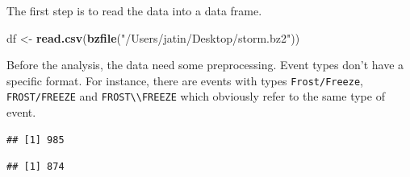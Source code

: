 \documentclass[]{article}
\newenvironment{Shaded}{\begin{snugshade}}{\end{snugshade}}
\newcommand{\KeywordTok}[1]{\textcolor[rgb]{0.13,0.29,0.53}{\textbf{#1}}}
\newcommand{\StringTok}[1]{\textcolor[rgb]{0.31,0.60,0.02}{#1}}
\newcommand{\CommentTok}[1]{\textcolor[rgb]{0.56,0.35,0.01}{\textit{#1}}}
\newcommand{\OperatorTok}[1]{\textcolor[rgb]{0.81,0.36,0.00}{\textbf{#1}}}
\newcommand{\NormalTok}[1]{#1}
\begin{document}
The first step is to read the data into a data frame.

\begin{Shaded}
\begin{Highlighting}[]
\NormalTok{df <-}\StringTok{ }\KeywordTok{read.csv}\NormalTok{(}\KeywordTok{bzfile}\NormalTok{(}\StringTok{"/Users/jatin/Desktop/storm.bz2"}\NormalTok{))}
\end{Highlighting}
\end{Shaded}

Before the analysis, the data need some preprocessing. Event types don't
have a specific format. For instance, there are events with types
\texttt{Frost/Freeze}, \texttt{FROST/FREEZE} and
\texttt{FROST\textbackslash{}\textbackslash{}FREEZE} which obviously
refer to the same type of event.

\begin{Shaded}
\end{Shaded}

\begin{verbatim}
## [1] 985
\end{verbatim}

\begin{Shaded}
\end{Shaded}

\begin{verbatim}
## [1] 874
\end{verbatim}

\begin{Shaded}
\end{Shaded}
\end{document}
